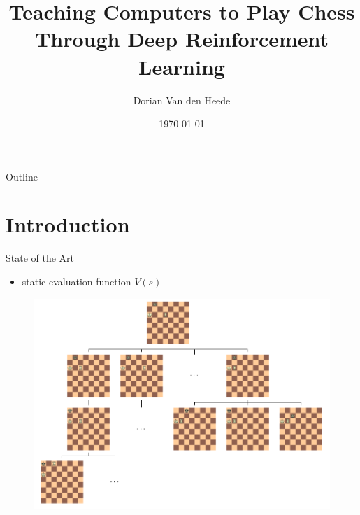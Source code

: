 \documentclass{beamer}
\title[Teaching Computers to Play Chess Through Deep Reinforcement Learning]{Teaching Computers to Play Chess Through Deep Reinforcement Learning}
\author{Dorian Van den Heede}
\institute{UGent}
\date{\today}
\begin{document}
\begin{frame}
  \titlepage
\end{frame}


\begin{frame}{Outline}
  \tableofcontents
\end{frame}

\section{Introduction}

\begin{frame}{State of the Art}
	\begin{itemize}
		\item static evaluation function $V(s)$
	\end{itemize}
	\begin{figure}
		\centering
		\includegraphics[scale=0.25]{searchtree}
	\end{figure}
\end{frame}
\end{document}
